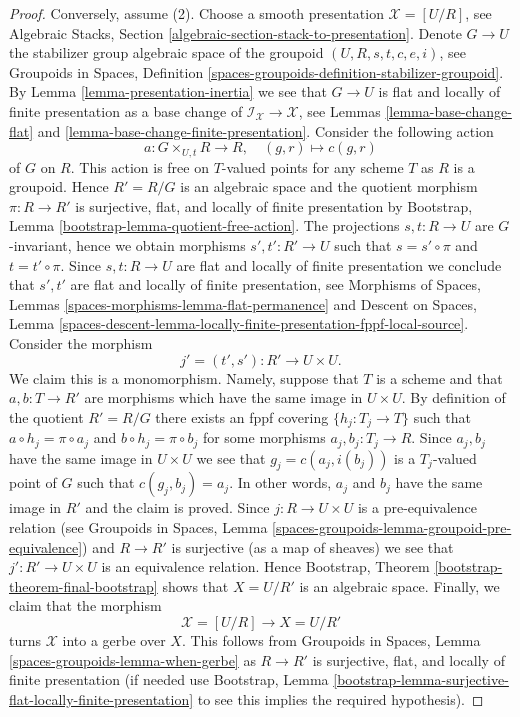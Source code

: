 \documentclass[10pt,a4paper]{amsart}
\theoremstyle{plain}
\theoremstyle{definition}
\theoremstyle{remark}
\numberwithin{equation}{subsection}
\begin{document}
\begin{proof}
\medskip\noindent
Conversely, assume (2). Choose a smooth presentation $\mathcal{X} = [U/R]$, see
Algebraic Stacks, Section \ref{algebraic-section-stack-to-presentation}.
Denote $G \to U$ the stabilizer group algebraic space of the groupoid
$(U, R, s, t, c, e, i)$, see
Groupoids in Spaces, Definition
\ref{spaces-groupoids-definition-stabilizer-groupoid}.
By
Lemma \ref{lemma-presentation-inertia}
we see that $G \to U$ is flat and locally of finite presentation as
a base change of $\mathcal{I}_\mathcal{X} \to \mathcal{X}$, see
Lemmas \ref{lemma-base-change-flat} and
\ref{lemma-base-change-finite-presentation}.
Consider the following action
$$
a : G \times_{U, t} R \to R, \quad (g, r) \mapsto c(g, r)
$$
of $G$ on $R$. This action is free on $T$-valued points for any
scheme $T$ as $R$ is a groupoid. Hence $R' = R/G$ is an algebraic
space and the quotient morphism $\pi : R \to R'$ is surjective,
flat, and locally of finite presentation by
Bootstrap, Lemma \ref{bootstrap-lemma-quotient-free-action}.
The projections $s, t : R \to U$ are $G$-invariant, hence
we obtain morphisms $s' , t' : R' \to U$ such that $s = s' \circ \pi$
and $t = t' \circ \pi$.
Since $s, t : R \to U$ are flat and locally of finite presentation
we conclude that $s', t'$ are flat and locally of finite presentation, see
Morphisms of Spaces, Lemmas
\ref{spaces-morphisms-lemma-flat-permanence} and
Descent on Spaces, Lemma
\ref{spaces-descent-lemma-locally-finite-presentation-fppf-local-source}.
Consider the morphism
$$
j' = (t', s') : R' \longrightarrow U \times U.
$$
We claim this is a monomorphism. Namely, suppose that $T$ is a scheme
and that $a, b : T \to R'$ are morphisms which have the same image
in $U \times U$. By definition of the quotient $R' = R/G$ there
exists an fppf covering $\{h_j : T_j \to T\}$ such
that $a \circ h_j = \pi \circ a_j$ and $b \circ h_j = \pi \circ b_j$
for some morphisms $a_j, b_j : T_j \to R$. Since $a_j, b_j$ have the same
image in $U \times U$ we see that $g_j = c(a_j, i(b_j))$ is a $T_j$-valued
point of $G$ such that $c(g_j, b_j) = a_j$. In other words, $a_j$ and
$b_j$ have the same image in $R'$ and the claim is proved.
Since $j : R \to U \times U$ is a pre-equivalence relation (see
Groupoids in Spaces, Lemma
\ref{spaces-groupoids-lemma-groupoid-pre-equivalence})
and $R \to R'$ is surjective (as a map of sheaves) we see that
$j' : R' \to U \times U$ is an equivalence relation.
Hence
Bootstrap, Theorem \ref{bootstrap-theorem-final-bootstrap}
shows that $X = U/R'$ is an algebraic space.
Finally, we claim that the morphism
$$
\mathcal{X} = [U/R] \longrightarrow X = U/R'
$$
turns $\mathcal{X}$ into a gerbe over $X$. This follows from
Groupoids in Spaces, Lemma \ref{spaces-groupoids-lemma-when-gerbe}
as $R \to R'$ is surjective, flat, and locally of finite presentation
(if needed use
Bootstrap, Lemma
\ref{bootstrap-lemma-surjective-flat-locally-finite-presentation}
to see this implies the required hypothesis).
\end{proof}
\end{document}
